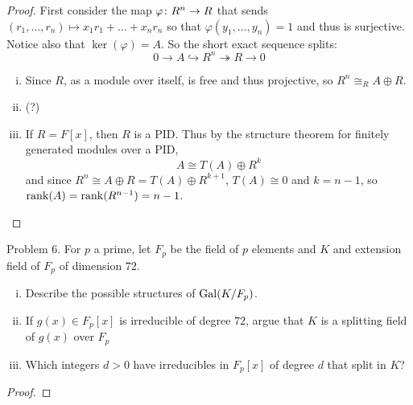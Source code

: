 \documentclass{article}
\begin{document}
\begin{proof}
  First consider the map ${\varphi \colon R^n \rightarrow R}$ that sends
  $(r_1, \hdots, r_n) \mapsto x_1r_1 + \hdots + x_nr_n$ so that
  $\varphi(y_1, \hdots, y_n) = 1$ and thus is surjective.
  Notice also that $\ker(\varphi) = A$. So the short exact sequence splits:
  \[
    0 \rightarrow A \hookrightarrow R^n \twoheadrightarrow R \rightarrow 0
  \]
  \begin{enumerate}[(i)]
    \item Since $R$, as a module over itself, is free and thus projective,
      so $R^n \cong_R A \oplus R$.
    \item (?)
    \item If $R = F[x]$, then $R$ is a PID. Thus by the
    structure theorem for finitely generated modules over a PID, \[
      A \cong T(A) \oplus R^k
    \] and since $R^n \cong A \oplus R = T(A) \oplus R^{k+1}$, $T(A) \cong 0$
    and $k = n - 1$, so $\operatorname{rank}(A) = \operatorname{rank}(R^{n-1}) = n - 1$.
  \end{enumerate}

\end{proof}
\pagebreak

\begin{subsection}{Problem 6.}
  For $p$ a prime, let $F_p$ be the field of $p$ elements and $K$ and extension
  field of $F_p$ of dimension $72$. \begin{enumerate}[(i)]
    \item Describe the possible structures of $\operatorname{Gal}(K/F_p)$.
    \item If $g(x) \in F_p[x]$ is irreducible of degree $72$, argue that $K$ is
      a splitting field of $g(x)$ over $F_p$
    \item Which integers $d > 0$ have irreducibles in $F_p[x]$ of degree $d$
      that split in $K$?
  \end{enumerate}
\end{subsection}

\begin{proof}
\end{proof}
\end{document}

